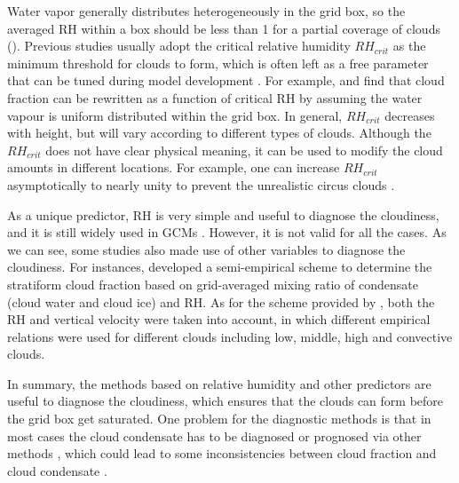 Water vapor generally distributes heterogeneously in the grid box, so the averaged RH within a box should be less than 1 for a partial coverage of clouds (). Previous studies usually adopt the critical relative humidity $RH_{crit}$ as the minimum threshold for clouds to form, which is often left as a free parameter that can be tuned during model development \citep[e.g.,][]{Hourdin2017,Kay2012,Mauritsen2012}. For example, \cite{Sundqvist1978} and \cite{Sundqvist1989} find that cloud fraction can be rewritten as a function of critical RH by assuming the water vapour is uniform distributed within the grid box. In general, $RH_{crit}$ decreases with height, but will vary according to different types of clouds. Although the $RH_{crit}$ does not have clear physical meaning, it can be used to modify the cloud amounts in different locations. For example, one can increase $RH_{crit}$ asymptotically to nearly unity to prevent the unrealistic circus clouds \citep{Sundqvist1989}. 

As a unique predictor, RH is very simple and useful to diagnose the cloudiness, and it is still widely used in GCMs \citep[e.g.,][]{Gordon1992,Park2014,Pope2000}. However, it is not valid for all the cases. As we can see, some studies also made use of other variables to diagnose the cloudiness. For instances, \cite{Xu1996} developed a semi-empirical scheme to determine the stratiform cloud fraction based on grid-averaged mixing ratio of condensate (cloud water and cloud ice) and RH. As for the scheme provided by \cite{Slingo1987}, both the RH and vertical velocity were taken into account, in which different empirical relations were used for different clouds including low, middle, high and convective clouds.

In summary, the methods based on relative humidity and other predictors are useful to diagnose the cloudiness, which ensures that the clouds can form before the grid box get saturated. One problem for the diagnostic methods is that in most cases the cloud condensate has to be diagnosed or prognosed via other methods \citep[e.g.,][]{Zhang2003,Park2014}, which could lead to some inconsistencies between cloud fraction and cloud condensate \citep[e.g.][]{Gregory2002,Tompkins2005}.


